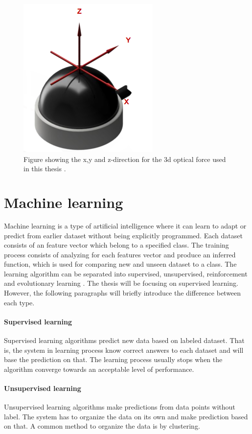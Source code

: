 \documentclass[USenglish]{ifimaster}  %
\begin{document}
	
	\begin{figure}[h]
		\centering
		\includegraphics[scale=0.8]{Figures/OptoforceAxis3}
		\caption{Figure showing the x,y and z-direction for the 3d optical force used in this thesis \cite{OptoforceSheet}.}
		\label{fig:OptoforceAxis}
	\end{figure}
	
	\section {Machine learning}
	Machine learning is a type of artificial intelligence where it can learn to adapt or predict from earlier dataset without being explicitly programmed. Each dataset consists of an feature vector which belong to a specified class. The training process consists of analyzing for each features vector and produce an inferred function, which is used for comparing new and unseen dataset to a class. The learning algorithm can be separated into supervised, unsupervised, reinforcement and evolutionary learning \cite{Marsland:2009:MLA:1571643}. The thesis will be focusing on supervised learning. However, the following paragraphs will briefly introduce the difference between each type.
	
	\paragraph{Supervised learning}
	Supervised learning algorithms predict new data based on labeled dataset. That is, the system in learning process know correct answers to each dataset and will base the prediction on that. The learning process usually stops when the algorithm converge towards an acceptable level of performance.
	
	\paragraph{Unsupervised learning}
	Unsupervised learning algorithms make predictions from data points without label. The system has to organize the data on its own and make prediction based on that. A common method to organize the data is by clustering.
	
\end{document}
